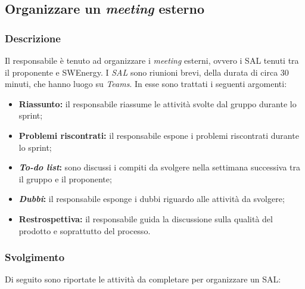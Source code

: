 \subsection{Organizzare un \textit{meeting} esterno}
\label{organizzare-meeting-esterno}

\subsubsection{Descrizione}
Il responsabile è tenuto ad organizzare i \textit{meeting} esterni, ovvero i SAL
tenuti tra il proponente e SWEnergy.
I \textit{SAL} sono riunioni brevi, della durata di circa 30 minuti, che hanno
luogo su \textit{Teams}. In esse
sono trattati i seguenti argomenti:
\begin{itemize}
	\item \textbf{Riassunto:} il responsabile riassume le attività svolte dal
	      gruppo durante lo sprint;

	\item \textbf{Problemi riscontrati:} il responsabile espone i problemi
	      riscontrati durante lo sprint;

	\item \textbf{\textit{To-do list}:} sono discussi i compiti da svolgere nella
	      settimana successiva tra il gruppo e il proponente;

	\item \textbf{\textit{Dubbi}:} il responsabile esponge i dubbi riguardo alle
	      attività da svolgere;

	\item \textbf{Restrospettiva:} il responsabile guida la discussione sulla
	      qualità del prodotto e soprattutto del processo.
\end{itemize}

\subsubsection{Svolgimento}
Di seguito sono riportate le attività da completare per organizzare un SAL:

